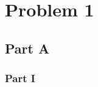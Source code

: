 \documentclass[12pt,letterpaper]{article}
\numberwithin{equation}{section}		                %
\numberwithin{figure}{section}	                		%
\numberwithin{table}{section}				            %
\begin{document}
\section{Problem 1}
\subsection{Part A}
\subsubsection{Part I}
\end{document}

